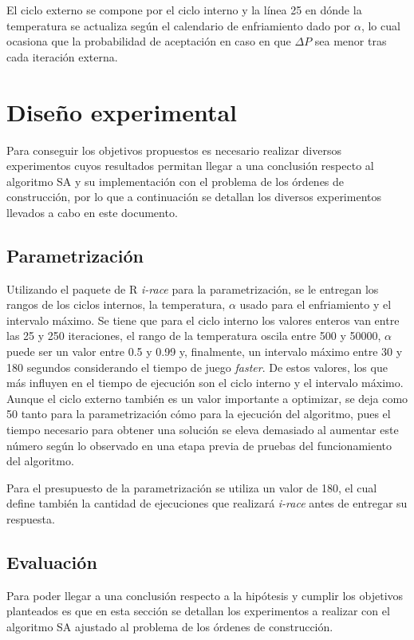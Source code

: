 El ciclo externo se compone por el ciclo interno y la línea 25 en dónde la temperatura se actualiza según el calendario de enfriamiento dado por $\alpha$, lo cual ocasiona que la probabilidad de aceptación en caso en que $\Delta P$ sea menor tras cada iteración externa.

\section{Diseño experimental}

Para conseguir los objetivos propuestos es necesario realizar diversos experimentos cuyos resultados permitan llegar a una conclusión respecto al algoritmo SA y su implementación con el problema de los órdenes de construcción, por lo que a continuación se detallan los diversos experimentos llevados a cabo en este documento.

\subsection{Parametrización}

Utilizando el paquete de R \textit{i-race} para la parametrización, se le entregan los rangos de los ciclos internos, la temperatura, $\alpha$ usado para el enfriamiento y el intervalo máximo. Se tiene que para el ciclo interno los valores enteros van entre las 25 y 250 iteraciones, el rango de la temperatura oscila entre 500 y 50000, $\alpha$ puede ser un valor entre 0.5 y 0.99 y, finalmente, un intervalo máximo entre 30 y 180 segundos considerando el tiempo de juego \textit{faster}. De estos valores, los que más influyen en el tiempo de ejecución son el ciclo interno y el intervalo máximo. Aunque el ciclo externo también es un valor importante a optimizar, se deja como 50 tanto para la parametrización cómo para la ejecución del algoritmo, pues el tiempo necesario para obtener una solución se eleva demasiado al aumentar este número según lo observado en una etapa previa de pruebas del funcionamiento del algoritmo.

Para el presupuesto de la parametrización se utiliza un valor de 180, el cual define también la cantidad de ejecuciones que realizará \textit{i-race} antes de entregar su respuesta.

\subsection{Evaluación}

Para poder llegar a una conclusión respecto a la hipótesis y cumplir los objetivos planteados es que en esta sección se detallan los experimentos a realizar con el algoritmo SA ajustado al problema de los órdenes de construcción.

